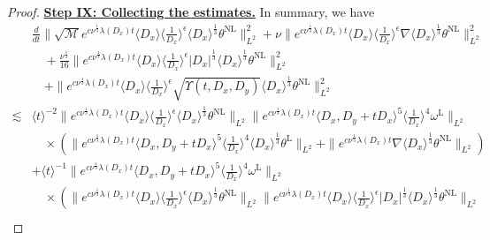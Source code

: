 \documentclass[reqno, 12pt]{amsart} %
\theoremstyle{plain} %
\theoremstyle{definition}
\theoremstyle{remark}
\numberwithin{equation}{section} %
\newcommand{\rt}{\right}
\begin{document}
\begin{proof}
		
		
		
		
		
		
		\underline{\bf Step IX: Collecting the estimates.}  In summary, we have
		\footnotesize{\begin{align*} 
				& \frac{d}{d t}\|\sqrt{\mathcal{M}} e^{c \nu^{\frac{1}{3}} \lambda\left(D_x\right) t}\langle D_x\rangle\langle\frac{1}{D_x}\rangle^\epsilon \langle D_x \rangle^\frac13  \theta^{\mathrm{NL}}\|_{L^2}^2+\nu\|e^{c \nu^{\frac{1}{3}} \lambda\left(D_x\right) t}\langle D_x\rangle\langle\frac{1}{D_x}\rangle^\epsilon \nabla \langle D_x \rangle^\frac13  \theta^{\mathrm{NL}}\|_{L^2}^2 \\
				& \quad+\frac{\nu^{\frac{1}{3}}}{16}\|e^{c \nu^{\frac{1}{3}} \lambda\left(D_x\right) t}\langle D_x\rangle\langle\frac{1}{D_x}\rangle^\epsilon\left|D_x\right|^{\frac{1}{3}}  \langle D_x \rangle ^\frac13 \theta^{\mathrm{NL}}\|_{L^2}^2  
				\\
				& \quad+\|e^{c \nu^{\frac{1}{3}} \lambda\left(D_x\right) t}\langle D_x\rangle\langle\frac{1}{D_x}\rangle^\epsilon \sqrt{\Upsilon\left(t, D_x, D_y\right)} \langle D_x \rangle^\frac13  \theta^{\mathrm{NL}}\|_{L^2}^2 \\
				\lesssim	& \langle t\rangle^{-2} \|e^{c \nu^{\frac{1}{3}} \lambda\left(D_x\right) t}\langle D_x\rangle  \langle \frac{1}{D_x}\rangle^\epsilon \langle D_x \rangle^\frac13  \theta^{\mathrm{NL}}\|_{L^2}    \|e^{c \nu^{\frac{1}{3}} \lambda\left(D_x\right) t}\langle D_x, D_y + tD_x\rangle^5\langle\frac{1}{D_x}\rangle^4 \omega^{\mathrm{L}} \|_{L^2} \\
				&\quad \times \left( \|e^{c \nu^{\frac{1}{3}} \lambda\left(D_x\right) t}\langle D_x, D_y + tD_x\rangle^5\langle\frac{1}{D_x}\rangle^4 \langle D_x \rangle^\frac13  \theta^{\mathrm{L}} \|_{L^2} +\|e^{c \nu^{\frac{1}{3}} \lambda\left(D_x\right) t} \nabla \langle D_x \rangle^\frac13  \theta^{\mathrm{NL}} \|_{L^2} \right)\\
				& +  \langle t\rangle^{-1}     \|e^{c \nu^{\frac{1}{3}} \lambda\left(D_x\right) t}\langle D_x, D_y+t D_x\rangle^5\langle\frac{1}{D_x}\rangle^4 \omega^{\mathrm{L}}\|_{L^2} \\
				& \quad \times \left(\|e^{c \nu^{\frac{1}{3}} \lambda\left(D_x\right) t}\langle D_x\rangle\langle\frac{1}{D_x}\rangle^\epsilon \langle D_x \rangle^\frac13 \theta^{\mathrm{NL}}\|_{L^2}  \| e^{c \nu^{\frac{1}{3}} \lambda\left(D_x\right) t} \langle D_x \rangle \langle\frac{1}{D_x}\rangle^\epsilon
				\left|D_x\right|^{\frac{1}{3}}  \langle D_x \rangle ^\frac13 \theta^{\mathrm{NL}} \|_{L^2} \rt.\\

\end{align*}}
\end{proof}
\end{document}
